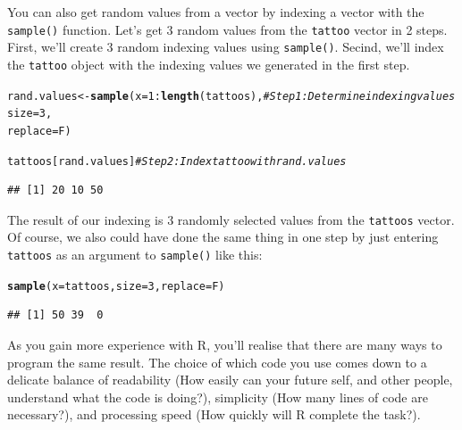 \documentclass{tufte-book}\usepackage[]{graphicx}\usepackage[]{color}
\makeatletter
\newcommand{\hlnum}[1]{\textcolor[rgb]{0.686,0.059,0.569}{#1}}%
\newcommand{\hlcom}[1]{\textcolor[rgb]{0.678,0.584,0.686}{\textit{#1}}}%
\newcommand{\hlopt}[1]{\textcolor[rgb]{0,0,0}{#1}}%
\newcommand{\hlstd}[1]{\textcolor[rgb]{0.345,0.345,0.345}{#1}}%
\newcommand{\hlkwb}[1]{\textcolor[rgb]{0.69,0.353,0.396}{#1}}%
\newcommand{\hlkwc}[1]{\textcolor[rgb]{0.333,0.667,0.333}{#1}}%
\newcommand{\hlkwd}[1]{\textcolor[rgb]{0.737,0.353,0.396}{\textbf{#1}}}%
\newenvironment{kframe}{%
 \def\at@end@of@kframe{}%
 \ifinner\ifhmode%
  \def\at@end@of@kframe{\end{minipage}}%
  \begin{minipage}{\columnwidth}%
 \fi\fi%
 \def\FrameCommand##1{\hskip\@totalleftmargin \hskip-\fboxsep
 \colorbox{shadecolor}{##1}\hskip-\fboxsep
     \hskip-\linewidth \hskip-\@totalleftmargin \hskip\columnwidth}%
 \MakeFramed {\advance\hsize-\width
   \@totalleftmargin\z@ \linewidth\hsize
   \@setminipage}}%
 {\par\unskip\endMakeFramed%
 \at@end@of@kframe}
\newenvironment{knitrout}{}{} %
\makeatother
\begin{document}
\begin{footnotesize}
You can also get random values from a vector by indexing a vector with the \texttt{sample()} function. Let's get 3 random values from the \texttt{tattoo} vector in 2 steps. First, we'll create 3 random indexing values using \texttt{sample()}. Secind, we'll index the \texttt{tattoo} object with the indexing values we generated in the first step.

\begin{footnotesize}
\begin{knitrout}
\color{fgcolor}\begin{kframe}
\begin{alltt}
\hlstd{rand.values} \hlkwb{<-} \hlkwd{sample}\hlstd{(}\hlkwc{x} \hlstd{=} \hlnum{1}\hlopt{:}\hlkwd{length}\hlstd{(tattoos),}  \hlcom{# Step 1: Determine indexing values}
                      \hlkwc{size} \hlstd{=} \hlnum{3}\hlstd{,}
                      \hlkwc{replace} \hlstd{= F)}

\hlstd{tattoos[rand.values]} \hlcom{# Step 2: Index tattoo with rand.values}
\end{alltt}
\begin{verbatim}
## [1] 20 10 50
\end{verbatim}
\end{kframe}
\end{knitrout}
\end{footnotesize}

The result of our indexing is 3 randomly selected values from the \texttt{tattoos} vector. Of course, we also could have done the same thing in one step by just entering \texttt{tattoos} as an argument to \texttt{sample()} like this:

\begin{footnotesize}
\begin{knitrout}
\color{fgcolor}\begin{kframe}
\begin{alltt}
\hlkwd{sample}\hlstd{(}\hlkwc{x} \hlstd{= tattoos,} \hlkwc{size} \hlstd{=} \hlnum{3}\hlstd{,} \hlkwc{replace} \hlstd{= F)}
\end{alltt}
\begin{verbatim}
## [1] 50 39  0
\end{verbatim}
\end{kframe}
\end{knitrout}
\end{footnotesize}

As you gain more experience with R, you'll realise that there are many ways to program the same result. The choice of which code you use comes down to a delicate balance of readability (How easily can your future self, and other people, understand what the code is doing?), simplicity (How many lines of code are necessary?), and processing speed (How quickly will R complete the task?).


\end{footnotesize}
\end{document}
